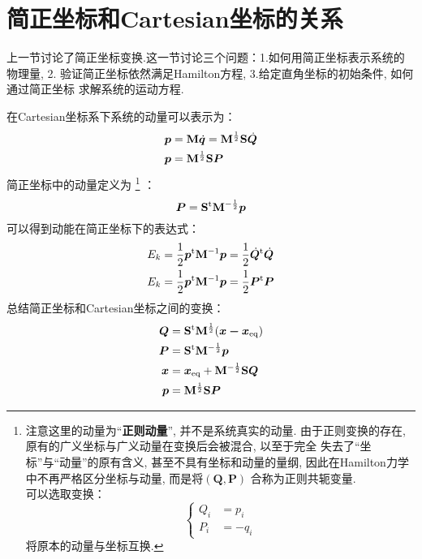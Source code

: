     \section{简正坐标和Cartesian坐标的关系}
    上一节讨论了简正坐标变换.这一节讨论三个问题：1.如何用简正坐标表示系统的物理量, 2.
    验证简正坐标依然满足Hamilton方程, 3.给定直角坐标的初始条件, 如何通过简正坐标
    求解系统的运动方程.

    \splitline

    在Cartesian坐标系下系统的动量可以表示为：
    \begin{equation}
        \begin{split}
        \bm{p} &= \mathbf{M}\dot{\bm{q}} = \mathbf{M}^{\frac 12} \mathbf{S}\dot{\bm{Q}}\\
        \bm{p} &= \mathbf{M}^{\frac{1}{2}}\mathbf{S}\bm{P}
        \end{split}
    \end{equation}
    简正坐标中的动量定义为
    \footnote{
        注意这里的动量为“\textbf{正则动量}”, 并不是系统真实的动量.
        由于正则变换的存在, 原有的广义坐标与广义动量在变换后会被混合, 以至于完全
        失去了“坐标”与“动量”的原有含义, 甚至不具有坐标和动量的量纲, 
        因此在Hamilton力学中不再严格区分坐标与动量, 而是将$(\bm{Q}, \bm{P})$
        合称为正则共轭变量.\\
        可以选取变换：
        \begin{equation}
            \left\{
                \begin{split}
                    Q_{i} &= p_i\\
                    P_{i} &= -q_i
                \end{split}
            \right.
        \end{equation}
        将原本的动量与坐标互换.
    }
    ：
    \begin{equation}
        \bm{P} = \mathbf{S}^{\mathrm{t}} \mathbf{M}^{-\frac 12} \bm{p}
    \end{equation}
    可以得到动能在简正坐标下的表达式：
    \begin{equation}
        \begin{split}
        E_{k} &= \frac{1}{2}\bm{p}^{\mathrm{t}}\mathbf{M}^{-1}\bm{p} = \frac{1}{2}\dot{\bm{Q}}^{\mathrm{t}}\dot{\bm{Q}}\\
        E_{k} &= \frac{1}{2}\bm{p}^{\mathrm{t}}\mathbf{M}^{-1}\bm{p} = \frac{1}{2}\bm{P}^{\mathrm{t}}\bm{P}
        \end{split}
    \end{equation}
    总结简正坐标和Cartesian坐标之间的变换：
    \begin{equation}
        \begin{aligned}
        \bm{Q} &= \mathbf{S}^\mathrm{t} \mathbf{M}^{\frac 12} (\bm{x-x}_\mathrm{eq})\\
        \bm{P} &= \mathbf{S}^\mathrm{t} \mathbf{M}^{-\frac 12} \bm{p}\\
        \bm{x} &= \bm{x}_\mathrm{eq} + \mathbf{M}^{-\frac 12}\mathbf{S}\bm{Q}\\
        \bm{p} &= \mathbf{M}^{\frac 12}\mathbf{S}\bm{P}
        \end{aligned}
        \label{normal mode and cartesian coordinate}
    \end{equation}


